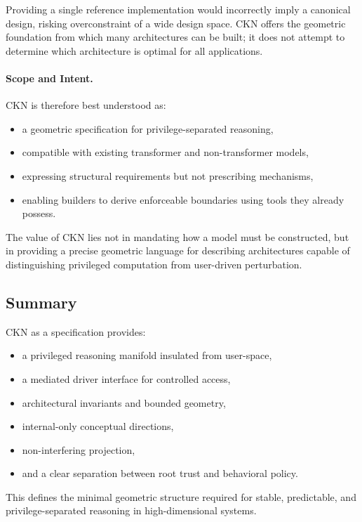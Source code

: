 \documentclass[11pt,a4paper]{article}
\begin{document}
Providing a single reference implementation would incorrectly imply a canonical design, risking overconstraint of a wide design space. CKN offers the geometric foundation from which many architectures can be built; it does not attempt to determine which architecture is optimal for all applications.

\paragraph{Scope and Intent.}

CKN is therefore best understood as:
\begin{itemize}
    \item a geometric specification for privilege-separated reasoning,
    \item compatible with existing transformer and non-transformer models,
    \item expressing structural requirements but not prescribing mechanisms,
    \item enabling builders to derive enforceable boundaries using tools they already possess.
\end{itemize}

The value of CKN lies not in mandating how a model must be constructed, but in providing a precise geometric language for describing architectures capable of distinguishing privileged computation from user-driven perturbation.

\subsection{Summary}

CKN as a specification provides:
\begin{itemize}
    \item a privileged reasoning manifold insulated from user-space,
    \item a mediated driver interface for controlled access,
    \item architectural invariants and bounded geometry,
    \item internal-only conceptual directions,
    \item non-interfering projection,
    \item and a clear separation between root trust and behavioral policy.
\end{itemize}

This defines the minimal geometric structure required for stable, predictable, and privilege-separated reasoning in high-dimensional systems.
\end{document}
